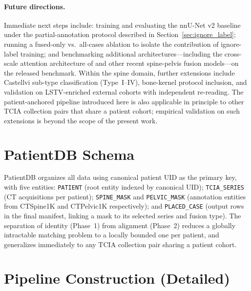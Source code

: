 \documentclass[pmlr]{jmlr}
\begin{document}
\paragraph{Future directions.}
Immediate next steps include: training and evaluating the
nnU-Net v2 baseline under the partial-annotation protocol described
in Section~\ref{sec:ignore_label}; running a fused-only vs.\
all-cases ablation to isolate the contribution of ignore-label
training; and benchmarking additional architectures---including the
cross-scale attention architecture of \citet{Li2025LumbarMechanism}
and other recent spine-pelvis fusion models---on the released
benchmark.
Within the spine domain, further extensions include Castellvi
sub-type classification (Type~I--IV), bone-kernel protocol
inclusion, and validation on LSTV-enriched external cohorts with
independent re-reading.
The patient-anchored pipeline introduced here is also applicable
in principle to other TCIA collection pairs that share a patient
cohort; empirical validation on such extensions is beyond the scope
of the present work.




\newpage
\appendix

\section{PatientDB Schema}
\label{app:patientdb}

PatientDB organizes all data using canonical patient UID as the
primary key, with five entities:
\texttt{PATIENT} (root entity indexed by canonical UID);
\texttt{TCIA\_SERIES} (CT acquisitions per patient);
\texttt{SPINE\_MASK} and \texttt{PELVIC\_MASK} (annotation entities
from CTSpine1K and CTPelvic1K respectively); and
\texttt{PLACED\_CASE} (output rows in the final manifest,
linking a mask to its selected series and fusion type).
The separation of identity (Phase~1) from alignment (Phase~2)
reduces a globally intractable matching problem to a locally
bounded one per patient, and generalizes immediately to any TCIA
collection pair sharing a patient cohort.

\section{Pipeline Construction (Detailed)}
\label{app:pipeline}
\end{document}
